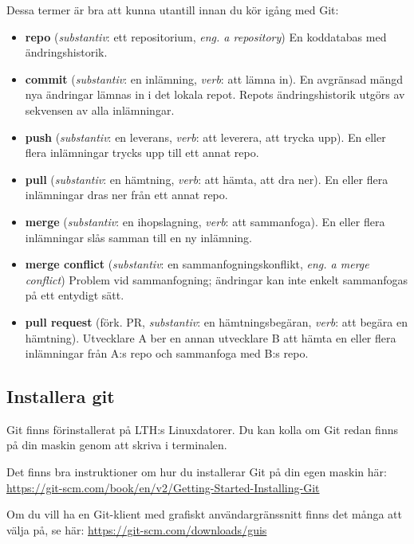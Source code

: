 Dessa termer är bra att kunna utantill innan du kör igång med Git:
\newcommand{\TermItem}[3]{\item \textbf{#1} (\textit{substantiv}: #2, \textit{verb}: #3).}
\begin{itemize}

\item \textbf{repo} (\textit{substantiv}: ett repositorium, \textit{eng. a repository}) En koddatabas med ändringshistorik. 

\TermItem{commit}{en inlämning}{att lämna in} 
  En avgränsad mängd nya ändringar lämnas in i det lokala repot. Repots ändringshistorik utgörs av sekvensen av alla inlämningar.

\TermItem{push}{en leverans}{att leverera, att trycka upp} En eller flera inlämningar trycks upp till ett annat repo.

\TermItem{pull}{en hämtning}{att hämta, att dra ner} En eller flera inlämningar dras ner från ett annat repo.

\TermItem{merge}{en ihopslagning}{att sammanfoga} En eller flera inlämningar slås samman till en ny inlämning. 

\item \textbf{merge conflict} (\textit{substantiv}: en sammanfogningskonflikt, \textit{eng. a merge conflict}) Problem vid sammanfogning; ändringar kan inte enkelt sammanfogas på ett entydigt sätt.

\item \textbf{pull request} (förk. PR, \textit{substantiv}: en hämtningsbegäran, \textit{verb}: att begära en hämtning). Utvecklare A ber en annan utvecklare B att hämta en eller flera inlämningar från A:s repo och sammanfoga med B:s repo.

\end{itemize}

\subsection{Installera git}\label{subsection:install-git}

Git finns förinstallerat på LTH:s Linuxdatorer. Du kan kolla om Git redan finns på din maskin genom att skriva  i terminalen. 

Det finns bra instruktioner om hur du installerar Git på din egen maskin här: \url{https://git-scm.com/book/en/v2/Getting-Started-Installing-Git}

Om du vill ha en Git-klient med grafiskt användargränssnitt finns det många att välja på, se här:  \url{https://git-scm.com/downloads/guis} 

